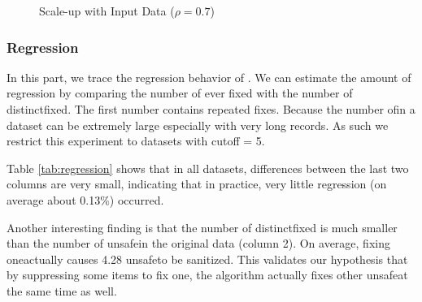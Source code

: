 \begin{figure}[th]
\flushleft
{}
\caption{Scale-up with Input Data ($\rho=0.7$)}\label{fig:scale}
\end{figure}

\subsubsection{Regression}\label{sec:eval:regression}
In this part, we trace the regression behavior of \PartialR.
We can estimate the amount of regression by comparing the number of
\qids ever fixed with the number of distinct\qids fixed. The first number
contains repeated \qid fixes. Because the number of\qids in a dataset can be
extremely large especially with very long records. As such we restrict this
experiment to datasets with cutoff = 5.

Table \ref{tab:regression} shows that in all
datasets, differences between the last two columns are very small,
indicating that in practice, very little regression (on average about 0.13\%)
occurred.

Another interesting finding is that the number of distinct\qids fixed
is much smaller than the number of unsafe\qids in the original data (column 2).
On average, fixing one\qid actually causes 4.28 unsafe\qids to be sanitized.
This validates our hypothesis that by suppressing some items to fix one\qid,
the algorithm actually fixes other unsafe\qids at the same time as well.

